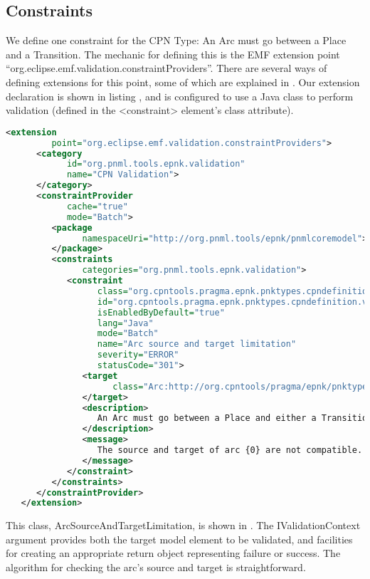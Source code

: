 \subsection{Constraints}

We define one constraint for the CPN Type: An Arc must go between a Place and a
Transition. The mechanic for defining this is the EMF extension point
``org.eclipse.emf.validation.constraintProviders''. There are several ways of
defining extensions for this point, some of which are explained in
\cite{kindler2011epnk}. Our extension declaration is shown in listing
, and is configured to use a Java class to perform
validation (defined in the \textless{}constraint\textgreater{} element's class
attribute).

\begin{lstlisting}[language=XML,label=lst:constraintextension,float,
caption=constraintProvider Extension] 
   <extension
         point="org.eclipse.emf.validation.constraintProviders">
      <category
            id="org.pnml.tools.epnk.validation"
            name="CPN Validation">
      </category>
      <constraintProvider
            cache="true"
            mode="Batch">
         <package
               namespaceUri="http://org.pnml.tools/epnk/pnmlcoremodel">
         </package>
         <constraints
               categories="org.pnml.tools.epnk.validation">
            <constraint
                  class="org.cpntools.pragma.epnk.pnktypes.cpndefinition.validation.ArcSourceAndTargetLimitation"
                  id="org.cpntools.pragma.epnk.pnktypes.cpndefinition.validation.ArcSourceAndTargetLimitation"
                  isEnabledByDefault="true"
                  lang="Java"
                  mode="Batch"
                  name="Arc source and target limitation"
                  severity="ERROR"
                  statusCode="301">
               <target
                     class="Arc:http://org.cpntools/pragma/epnk/pnktypes/cpndefinition">
               </target>
               <description>
                  An Arc must go between a Place and either a Transition or a Page.
               </description>
               <message>
                  The source and target of arc {0} are not compatible.
               </message>
            </constraint>
         </constraints>
      </constraintProvider>
   </extension>
\end{lstlisting}

This class, ArcSourceAndTargetLimitation, is shown in .
The IValidationContext argument provides both the target model element to be
validated, and facilities for creating an appropriate return object representing
failure or success. The algorithm for checking the arc's source and target is
straightforward.


